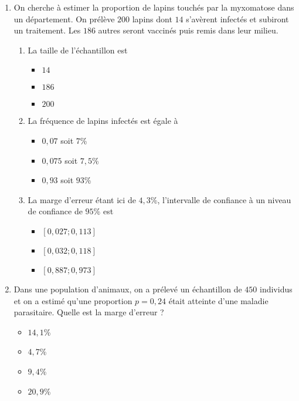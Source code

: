 \documentclass[11pt]{article}
\begin{document}
\begin{enumerate}
\begin{enumerate}
\begin{multicols}{3}
      \end{multicols}
  \end{enumerate}
\item On cherche à estimer la proportion de lapins touchés par la myxomatose
  dans un département. On prélève $200$ lapins dont $14$ s'avèrent infectés et
  subiront un traitement. Les $186$ autres seront vaccinés puis remis dans leur
  milieu.
  \begin{enumerate}
    \item La taille de l'échantillon est
      \begin{multicols}{3}
        \begin{itemize}[label=$\Box$]
          \item $14$
          \item $186$
          \item $200$
        \end{itemize}
      \end{multicols}
    \item  La fréquence de lapins infectés est égale à
      \begin{multicols}{3}
        \begin{itemize}[label=$\Box$]
          \item $0,07$ soit $7$\%
          \item $0,075$ soit $7,5$\%
          \item $0,93$ soit $93$\%
        \end{itemize}
      \end{multicols}
    \item La marge d'erreur étant ici de $4,3$\%, l'intervalle de confiance à un
      niveau de confiance de $95$\% est
      \begin{multicols}{3}
        \begin{itemize}[label=$\Box$]
          \item $\left[ 0,027 ; 0,113 \right]$
          \item $\left[ 0,032 ; 0,118 \right]$
          \item $\left[ 0,887 ; 0,973 \right]$
        \end{itemize}
      \end{multicols}
  \end{enumerate}
\item Dans une population d'animaux, on a prélevé un échantillon de $450$
  individus et on a estimé qu'une proportion $p=0,24$ était atteinte d'une
  maladie parasitaire. Quelle est la marge d'erreur ?
  \begin{multicols}{4}
    \begin{itemize}[label=$\Box$]
      \item $14,1$\%
      \item $4,7$\%
      \item $9,4$\%
      \item $20,9$\%
    \end{itemize}
  \end{multicols}
\end{enumerate}
\end{document}
